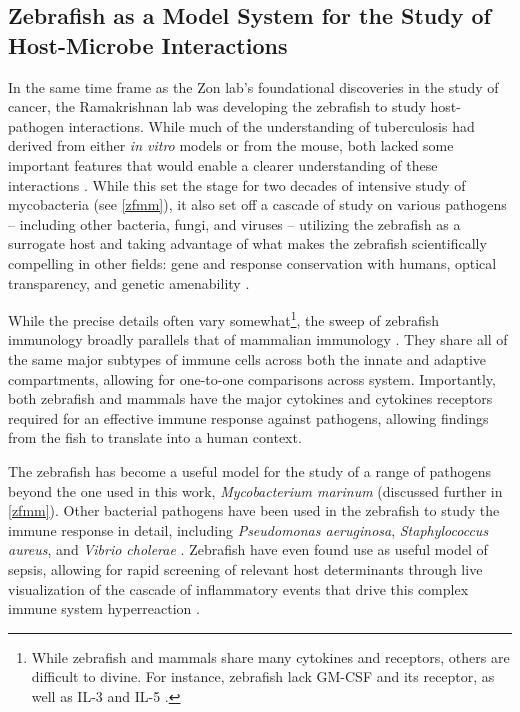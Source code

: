 \subsection{Zebrafish as a Model System for the Study of Host-Microbe Interactions}

In the same time frame as the Zon lab's foundational discoveries in the study of cancer, the Ramakrishnan lab was developing the zebrafish to study host-pathogen interactions. While much of the understanding of tuberculosis had derived from either \textit{in vitro} models or from the mouse, both lacked some important features that would enable a clearer understanding of these interactions \citep{Davis2002}. While this set the stage for two decades of intensive study of mycobacteria (see \autoref{zfmm}), it also set off a cascade of study on various pathogens -- including other bacteria, fungi, and viruses -- utilizing the zebrafish as a surrogate host and taking advantage of what makes the zebrafish scientifically compelling in other fields: gene and response conservation with humans, optical transparency, and genetic amenability \citep{Kanther2010, Angosto2014, Levraud2014}.

While the precise details often vary somewhat\footnote{While zebrafish and mammals share many cytokines and receptors, others are difficult to divine. For instance, zebrafish lack GM-CSF and its receptor, as well as IL-3 and IL-5 \citep{Pazhakh2018}.}, the sweep of zebrafish immunology broadly parallels that of mammalian immunology \citep{Zou2016, Renshaw2012}. They share all of the same major subtypes of immune cells across both the innate and adaptive compartments, allowing for one-to-one comparisons across system. Importantly, both zebrafish and mammals have the major cytokines and cytokines receptors required for an effective immune response against pathogens, allowing findings from the fish to translate into a human context. 

The zebrafish has become a useful model for the study of a range of pathogens beyond the one used in this work, \textit{Mycobacterium marinum} \citep{Benard2012, Brannon2009, Briolat2014} (discussed further in \autoref{zfmm}). Other bacterial pathogens have been used in the zebrafish to study the immune response in detail, including \textit{Pseudomonas aeruginosa}, \textit{Staphylococcus aureus}, and \textit{Vibrio cholerae} \citep{Runft2014}. Zebrafish have even found use as useful model of sepsis, allowing for rapid screening of relevant host determinants through live visualization of the cascade of inflammatory events that drive this complex immune system hyperreaction \citep{Barber2016, Philip2017, Ruyra2014}.

